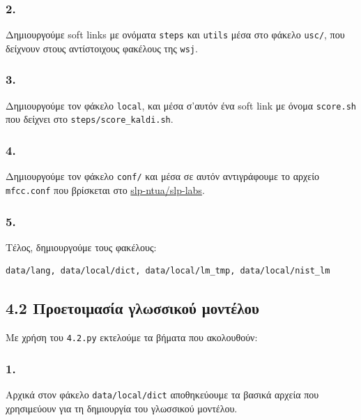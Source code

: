 \documentclass[a4paper, 12pt]{article}
\begin{document}
        \subsubsection*{2.}
            Δημιουργούμε soft links με ονόματα \verb|steps| και \verb|utils| μέσα στο φάκελο \verb|usc/|, που δείχνουν στους αντίστοιχους φακέλους της \verb|wsj|.
        
        \subsubsection*{3.} 
            Δημιουργούμε τον φάκελο \verb|local|, και μέσα σ'αυτόν ένα soft link με όνομα \verb|score.sh| που δείχνει στο \verb|steps/score_kaldi.sh|. 
        
        \subsubsection*{4.} 
            Δημιουργούμε τον φάκελο \verb|conf/| και μέσα σε αυτόν αντιγράφουμε το αρχείο \verb|mfcc.conf| που βρίσκεται στο \href{https://github.com/slp-ntua/slp-labs/blob/master/lab2/mfcc.conf}{slp-ntua/slp-labs}.
        
        \subsubsection*{5.}
            Τέλος, δημιουργούμε τους φακέλους:
            
            \begin{verbatim}
data/lang, data/local/dict, data/local/lm_tmp, data/local/nist_lm
            \end{verbatim}
        
    \subsection*{4.2 Προετοιμασία γλωσσικού μοντέλου}
    
        Με χρήση του \verb|4.2.py| εκτελούμε τα βήματα που ακολουθούν:
    
        \subsubsection*{1.}
            Αρχικά στον φάκελο \verb|data/local/dict| αποθηκεύουμε τα βασικά αρχεία που χρησιμεύουν για τη δημιουργία του γλωσσικού μοντέλου.
            
\end{document}
